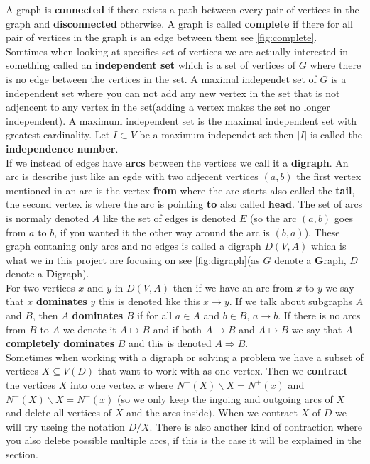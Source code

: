 A graph is \textbf{connected} if there exists a path between every pair of vertices in the graph and \textbf{disconnected} otherwise.
A graph is called \textbf{complete} if there for all pair of vertices in the graph is an edge between them see \autoref{fig:complete}.\\
Somtimes when looking at specifics set of vertices we are actually interested in something called an \textbf{independent set} which is a set of vertices of $G$ where there is no edge between the vertices in the set. A maximal independet set of $G$ is a independent set where you can not add any new vertex in the set that is not adjencent to any vertex in the set(adding a vertex makes the set no longer independent).  
A maximum independent set is the maximal independent set with greatest cardinality. 
Let $I\subset V$ be a maximum independet set then $|I|$ is called the \textbf{independence number}. \\ 

If we instead of edges have \textbf{arcs} between the vertices we call it a \textbf{digraph}.
An arc is describe just like an egde with two adjecent vertices $(a,b)$ the first vertex mentioned in an arc is the vertex \textbf{from} where the arc starts also called the \textbf{tail}, the second vertex is where the arc is pointing \textbf{to} also called \textbf{head}. The set of arcs is normaly denoted $A$ like the set of edges is denoted $E$ 
(so the arc $(a,b)$ goes from $a$ to $b$, if you wanted it the other way around the arc is $(b,a)$).
These graph contaning only arcs and no edges is called a digraph $D(V,A)$ which is what we in this project are focusing on see \autoref{fig:digraph}(as $G$ denote a \textbf{G}raph, $D$ denote a \textbf{D}igraph).\\
For two vertices $x$ and $y$ in $D(V,A)$ then if we have an arc from $x$ to $y$ we say that $x$ \textbf{dominates} $y$ this is denoted like this $x \rightarrow y$. If we talk about subgraphs $A$ and $B$, then $A$ \textbf{dominates} $B$ if for all $a\in A$ and $b\in B$, $a \rightarrow b$. If there is no arcs from $B$ to $A$ we denote it $A\mapsto B$ and if both $A\rightarrow B$ and $A \mapsto B$ we say that $A$ \textbf{completely dominates} $B$ and this is denoted $A\Rightarrow B$.\\ 

Sometimes when working with a digraph or solving a problem we have a subset of vertices $X\subseteq V(D)$ that want to work with as one vertex. 
Then we \textbf{contract} the vertices $X$ into one vertex $x$ where $N^+(X)\backslash X=N^+(x)$ and $N^-(X)\backslash X=N^-(x)$ (so we only keep the ingoing and outgoing arcs of $X$ and delete all vertices of $X$ and the arcs inside). When we contract $X$ of $D$ we will try useing the notation $D/X$. There is also another kind of contraction where you also delete possible multiple arcs, if this is the case it will be explained in the section.\\


